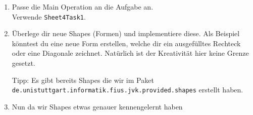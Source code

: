 
\begin{enumerate}
	\item
		Passe die Main Operation an die Aufgabe an.\\
		Verwende \lstinline{Sheet4Task1}.

	\item
		Überlege dir neue Shapes (Formen) und implementiere diese.
		Als Beispiel könntest du eine neue Form erstellen, welche dir ein ausgefülltes Rechteck oder eine Diagonale zeichnet.
		Natürlich ist der Kreativität hier keine Grenze gesetzt.

		Tipp: Es gibt bereits Shapes die wir im Paket \lstinline{de.unistuttgart.informatik.fius.jvk.provided.shapes} erstellt haben.

	\item
		Nun da wir Shapes etwas genauer kennengelernt haben
		\optional{}

\end{enumerate}

\newpage
